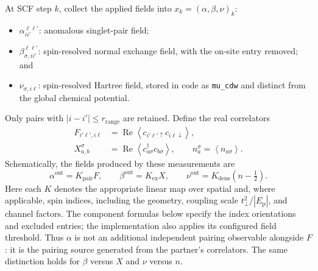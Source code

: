\documentclass[11pt]{article}
\newcommand{\Ep}{E_{\mathrm p}}
\newcommand{\tp}{t_{\perp}}
\newcommand{\mean}[1]{\left\langle #1\right\rangle}
\begin{document}
At SCF step \(k\), collect the applied fields into
\(x_k=(\alpha,\beta,\nu)_k\):
\begin{itemize}
  \item \(\alpha_{ii'}^{\ell\ell'}\): anomalous singlet-pair field;
  \item \(\beta_{\sigma,ii'}^{\ell\ell'}\): spin-resolved normal exchange
        field, with the on-site entry removed; and
  \item \(\nu_{\sigma,i\ell}\): spin-resolved Hartree field, stored in code as
        \texttt{mu\_cdw} and distinct from the global chemical potential.
\end{itemize}
Only pairs with \(|i-i'|\le r_{\mathrm{range}}\) are retained.  Define the real
correlators
\begin{align}
 F_{i'\ell',i\ell}&=\operatorname{Re}
   \mean{c_{i'\ell'\uparrow}c_{i\ell\downarrow}},\\
 X^{\sigma}_{a,b}&=\operatorname{Re}
   \mean{c^{\dagger}_{a\sigma}c_{b\sigma}},
 \qquad n^{\sigma}_{a}=\mean{n_{a\sigma}}.
\end{align}
Schematically, the fields produced by these measurements are
\begin{equation}
 \alpha^{\mathrm{out}}=K_{\mathrm{pair}}F,\qquad
 \beta^{\mathrm{out}}=K_{\mathrm{ex}}X,\qquad
 \nu^{\mathrm{out}}=K_{\mathrm{dens}}(n-\tfrac12).
\label{eq:correlators-to-fields}
\end{equation}
Here each \(K\) denotes the appropriate linear map over spatial and, where
applicable, spin indices, including the geometry, coupling scale
\(\tp^2/|\Ep|\), and channel factors.  The component formulas below specify
the index orientations and excluded entries; the implementation also applies
its configured field threshold.  Thus \(\alpha\) is not an additional
independent pairing observable alongside \(F\): it is the pairing source
generated from the partner's correlators.  The same distinction holds for
\(\beta\) versus \(X\) and \(\nu\) versus \(n\).
\end{document}
